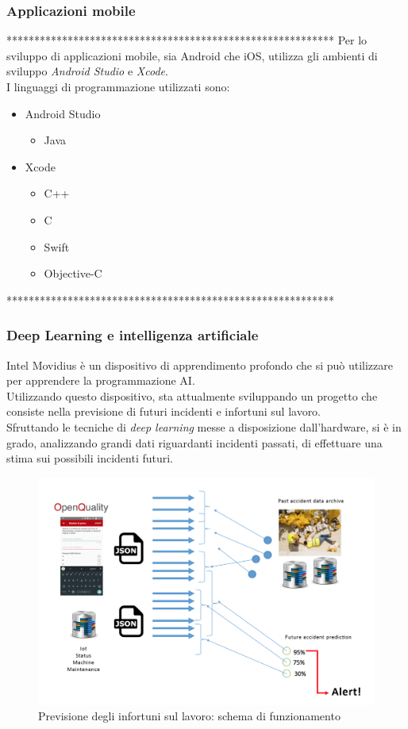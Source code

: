\subsubsection{Applicazioni mobile}
***********************************************************
Per lo sviluppo di applicazioni mobile, sia Android che iOS, \lab{} utilizza gli ambienti di sviluppo \textit{Android Studio} e \textit{Xcode}.\\
I linguaggi di programmazione utilizzati sono:
\begin{itemize}
\item Android Studio
	\begin{itemize}
		\item Java
	\end{itemize}
\item Xcode
	\begin{itemize}
		\item C++
		\item C
		\item Swift
		\item Objective-C
	\end{itemize}
\end{itemize}
***********************************************************

\subsubsection{Deep Learning e intelligenza artificiale}
Intel Movidius è un dispositivo di apprendimento profondo che si può utilizzare per apprendere la programmazione AI.\\
Utilizzando questo dispositivo, \lab{} sta attualmente sviluppando un progetto che consiste nella previsione di futuri incidenti e infortuni sul lavoro.\\
Sfruttando le tecniche di \textit{deep learning} messe a disposizione dall'hardware, si è in grado, analizzando grandi dati riguardanti incidenti passati, di effettuare una stima sui possibili incidenti futuri.
\begin{figure}[H]
	\begin{center}
	\includegraphics[scale=0.25]{immagini/accident_prediction.png}
	\caption{Previsione degli infortuni sul lavoro: schema di funzionamento}
	\end{center}
\end{figure}

